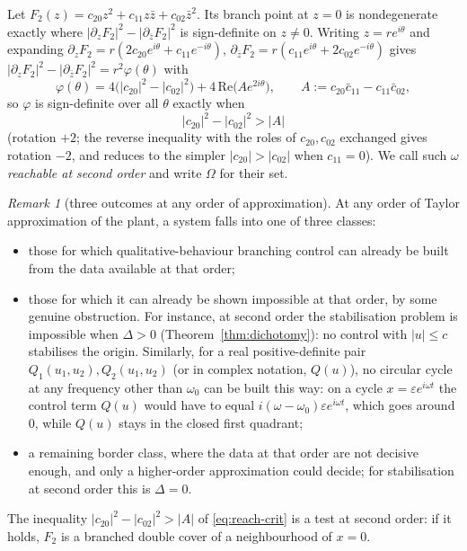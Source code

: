 \documentclass[11pt,reqno]{amsart}
\theoremstyle{plain}
\theoremstyle{definition}
\theoremstyle{remark}
\newtheorem*{remark}{Remark}
\begin{document}
Let $F_2(z)=c_{20}z^{2}+c_{11}z\bar z+c_{02}\bar z^{2}$. Its branch point at $z=0$ is
nondegenerate exactly where $|\partial_zF_2|^{2}-|\partial_{\bar z}F_2|^{2}$ is sign-definite on
$z\neq0$. Writing $z=re^{i\theta}$ and expanding $\partial_zF_2=r(2c_{20}e^{i\theta}+c_{11}e^{-i\theta})$,
$\partial_{\bar z}F_2=r(c_{11}e^{i\theta}+2c_{02}e^{-i\theta})$ gives
$|\partial_zF_2|^{2}-|\partial_{\bar z}F_2|^{2}=r^{2}\varphi(\theta)$ with
\begin{equation}\label{eq:varphi}
  \varphi(\theta)=4\bigl(|c_{20}|^{2}-|c_{02}|^{2}\bigr)+4\,\mathrm{Re}\bigl(Ae^{2i\theta}\bigr),
  \qquad A:=c_{20}\bar c_{11}-c_{11}\bar c_{02},
\end{equation}
so $\varphi$ is sign-definite over all $\theta$ exactly when
\begin{equation}\label{eq:reach-crit}
  |c_{20}|^{2}-|c_{02}|^{2}>|A|
\end{equation}
(rotation $+2$; the reverse inequality with the roles of $c_{20},c_{02}$ exchanged gives rotation
$-2$, and reduces to the simpler $|c_{20}|>|c_{02}|$ when $c_{11}=0$). We call such $\omega$
\emph{reachable at second order} and write $\Omega$ for their set.

\begin{remark}[three outcomes at any order of approximation]
At any order of Taylor approximation of the plant, a system falls into one of three classes:
\begin{itemize}
\item those for which qualitative-behaviour branching control can already be built from the data
available at that order;
\item those for which it can already be shown impossible at that order, by some genuine obstruction. For instance, at second order the stabilisation problem is impossible when $\Delta>0$ (Theorem~\ref{thm:dichotomy}): no control with $|u|\le c$ stabilises the origin. Similarly, for a real positive-definite pair
$Q_1(u_1,u_2),Q_2(u_1,u_2)$ (or in complex notation, $Q(u)$), no circular cycle at any frequency
other than $\omega_0$ can be built this way: on a cycle $x=\varepsilon e^{i\omega t}$ the control term $Q(u)$ would have to equal $i(\omega-\omega_0)\varepsilon e^{i\omega t}$, which goes around $0$, while $Q(u)$ stays in the closed first quadrant;
\item a remaining border class, where the data at that order are not decisive enough, and only a
higher-order approximation could decide; for stabilisation at second order this is $\Delta=0$.
\end{itemize}
The inequality $|c_{20}|^{2}-|c_{02}|^{2}>|A|$ of \eqref{eq:reach-crit} is a test at second order: if it holds,
$F_2$ is a branched double cover of a neighbourhood of $x=0$.
\end{remark}
\end{document}
